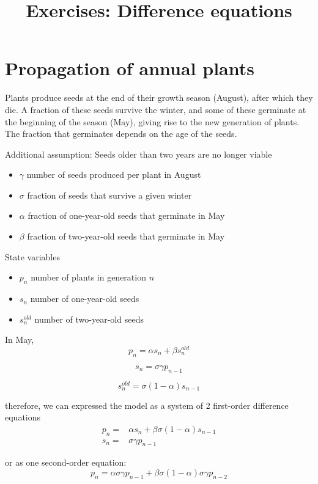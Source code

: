 \documentclass{article}
\title{Exercises: Difference equations}
\begin{document}
\maketitle



\section{Propagation of annual plants}
Plants produce seeds at the end of their growth season (August), after which they die. A fraction of these seeds survive the winter, and some of these germinate at the beginning of the season (May), giving rise to the new generation of plants. The fraction that germinates depends on the age of the seeds. 

Additional assumption: Seeds older than two years are no longer viable


\begin{itemize}
\item $\gamma$ number of seeds produced per plant in August
\item $\sigma$ fraction of seeds that survive a given winter
\item $\alpha$ fraction of one-year-old seeds that germinate in May
\item $\beta$ fraction of two-year-old seeds that germinate in May
\end{itemize}

State variables
\begin{itemize}
\item $p_n$ number of plants in generation $n$
\item $s_n$ number of one-year-old seeds
\item $s_{n}^{old}$ number of two-year-old seeds
\end{itemize}

In May, $$p_n=\alpha s_n+\beta s_{n}^{old}$$

$$s_{n}=\sigma \gamma p_{n-1}$$

$$s_{n}^{old}=\sigma (1-\alpha)s_{n-1}$$

therefore, we can expressed the model as a system of 2 first-order difference equations
\begin{equation}
\begin{array}{ll}
p_n=&\alpha s_n+\beta \sigma (1-\alpha)s_{n-1}\\
s_{n}=&\sigma \gamma p_{n-1}
\end{array}
\end{equation}

or as one second-order equation:
$$p_n=\alpha \sigma \gamma p_{n-1}+\beta \sigma (1-\alpha)\sigma \gamma p_{n-2}$$
\end{document}
